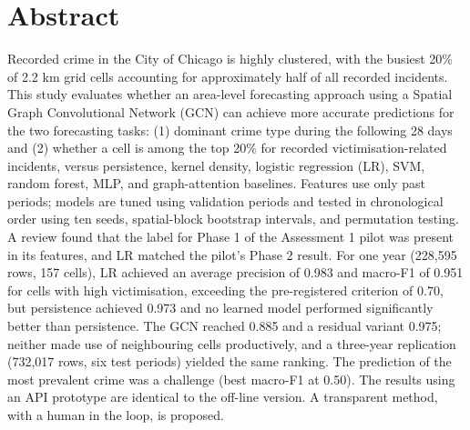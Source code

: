 \documentclass[11pt,a4paper]{report}
\begin{document}
\chapter*{Abstract}
Recorded crime in the City of Chicago is highly clustered, with the busiest 20\% of 2.2 km grid cells accounting for approximately half of all recorded incidents. This study evaluates whether an area-level forecasting approach using a Spatial Graph Convolutional Network (GCN) can achieve more accurate predictions for the two forecasting tasks: (1) dominant crime type during the following 28 days and (2) whether a cell is among the top 20\% for recorded victimisation-related incidents, versus persistence, kernel density, logistic regression (LR), SVM, random forest, MLP, and graph-attention baselines. Features use only past periods; models are tuned using validation periods and tested in chronological order using ten seeds, spatial-block bootstrap intervals, and permutation testing. A review found that the label for Phase 1 of the Assessment 1 pilot was present in its features, and LR matched the pilot's Phase 2 result. For one year (228,595 rows, 157 cells), LR achieved an average precision of 0.983 and macro-F1 of 0.951 for cells with high victimisation, exceeding the pre-registered criterion of 0.70, but persistence achieved 0.973 and no learned model performed significantly better than persistence. The GCN reached 0.885 and a residual variant 0.975; neither made use of neighbouring cells productively, and a three-year replication (732,017 rows, six test periods) yielded the same ranking. The prediction of the most prevalent crime was a challenge (best macro-F1 at 0.50). The results using an API prototype are identical to the off-line version. A transparent method, with a human in the loop, is proposed.

\tableofcontents
\listoffigures
\listoftables
\end{document}
